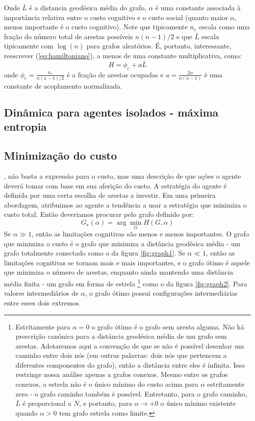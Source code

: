 Onde $\bar{L}$ é a distancia geodésica média do grafo, $\alpha$ é uma constante associada à importância relativa entre o custo cognitivo e o custo social (quanto maior $\alpha$, menos importante é o custo cognitivo). Note que tipicamente $n_{e}$ escala como uma fração do número total de arestas possíveis $n(n-1)/2$ e que $\bar{L}$ escala tipicamente com $\log(n)$ para grafos aleatórios. É, portanto, interessante, reescrever (\ref{eq:hamiltoniano}), a menos de uma constante multiplicativa, como:
\begin{equation}
   \label{eq:hamiltoniano2}
   H = \phi_{e}  + a \bar{L}
\end{equation}
onde $\phi_{e} = \frac{n_{e}}{n(n-1)/2}$ é a fração de arestas ocupadas e $a = \frac{2\alpha}{n(n-1)}$ é uma constante de acoplamento normalizada. 

\subsection{Dinâmica para agentes isolados - máxima entropia}
\subsection{Minimização do custo}
\label{sec:mincusto}
, não basta a expressão para o custo, mas uma descrição de que ações o agente deverá tomar com base em sua aferição do custo. A estratégia do agente é definida por uma certa escolha de arestas a investir. Em uma primeira abordagem, atribuimos ao agente a tendência a usar a estratégia que minimiza o custo total. Então deveriamos procurar pelo grafo definido por:
\begin{equation}
\label{eq:minimize}
  G_{\star}(\alpha) = \arg\min_{G} H(G,\alpha)
\end{equation}
Se $\alpha \gg 1$, então as limitações cognitivas são menos e menos importantes. O grafo que minimiza o custo é o grafo que minimiza a distância geodésica média - um grafo totalmente conectado como o da figura \ref{fig:graph1}. Se \(\alpha \ll 1\), então as limitações cognitivas se tornam mais e mais importantes, e o grafo ótimo é aquele que minimiza o número de arestas, enquanto ainda mantendo uma distância média finita - um grafo em forma de estrela \footnote{Estritamente para \(\alpha = 0\) o grafo ótimo é o grafo sem aresta alguma. Não há prescrição canônica para a distância geodésica média de um grafo sem arestas. Adotaremos aqui a convenção de que se não é possível desenhar um caminho entre dois nós (em outras palavras: dois nós que pertencem a diferentes componentes do grafo), então a distância entre eles é infinita. Isso restringe nossa análise apenas a grafos conexos. Mesmo entre os grafos conexos, a estrela não é o único mínimo do custo acima para \(\alpha\) estritamente zero - o grafo caminho 
também é possível. Entretanto, para o grafo caminho, \(\bar{L}\) é proporcional a \(N\), e portanto, para $\alpha \to +0$ o único mínimo existente quando $\alpha > 0$ tem grafo estrela como limite. } como o da figura \ref{fig:graph2}. Para valores intermediários de \(\alpha\), o grafo ótimo possui configurações intermediárias entre esses dois extremos. 

